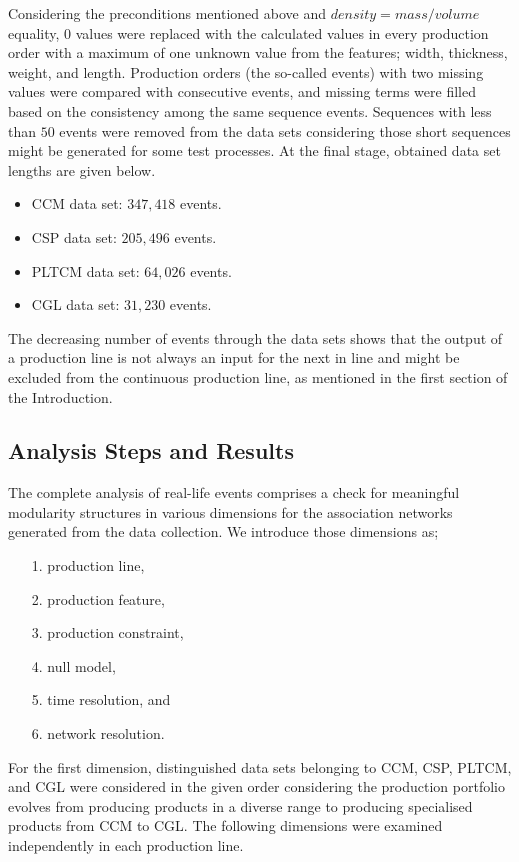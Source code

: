 Considering the preconditions mentioned above and $density = mass/volume$ equality, $0$ values were replaced with the calculated values in every production order with a maximum of one unknown value from the features; width, thickness, weight, and length. {\color{red}Production orders (the so-called events)} with two missing values were compared with consecutive events, and missing terms were filled based on the consistency among the same sequence events. Sequences with less than $50$ events were removed from the data sets considering those short sequences might be generated for some test processes. At the final stage, obtained data set lengths are given below.
\begin{itemize}
	\item CCM data set: $347,418$ events.
	\item CSP data set: $205,496$ events.
	\item PLTCM data set: $64,026$ events.
	\item CGL data set: $31,230$ events.
\end{itemize}
The decreasing number of events through the data sets shows that the output of a production line is not always an input for the next in line and might be excluded from the continuous production line, as mentioned in {\color{red}the first section of the Introduction}.

\subsection*{Analysis Steps and Results}
%

The complete analysis of real-life events comprises a check for meaningful modularity structures in various dimensions for the association networks generated from the data collection. We introduce those dimensions as;
\begin{itemize}
	\item[1.] production line,
	\item[2.] production feature,
	\item[3.] production constraint,
	\item[4.] null model,
	\item[5.] time resolution, and
	\item[6.] network resolution.
\end{itemize} 
For the first dimension, distinguished data sets belonging to CCM, CSP, PLTCM, and CGL were considered in the given order considering {\color{red}the production portfolio evolves from producing products in a diverse range to producing specialised products from CCM to CGL}. The following dimensions were examined independently in each production line.

